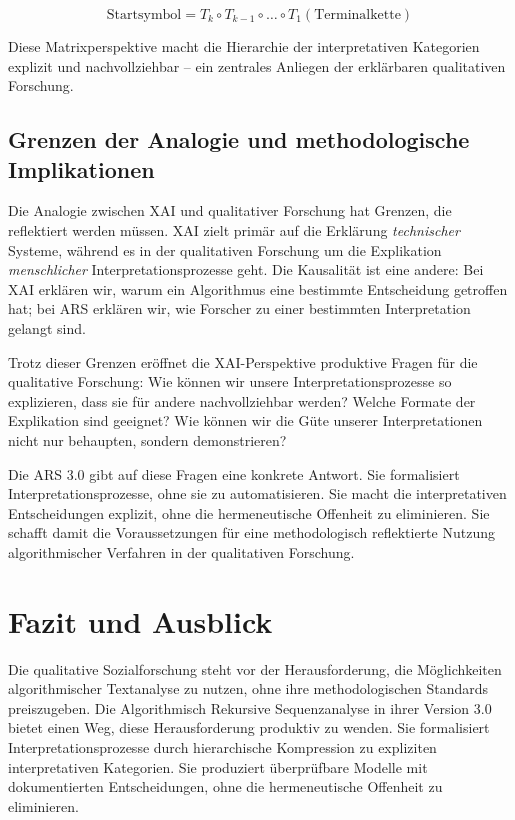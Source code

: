\documentclass[
  12pt,
  a4paper,
  oneside,
  titlepage
]{article}
\begin{document}
\[
\text{Startsymbol} = T_k \circ T_{k-1} \circ \ldots \circ T_1(\text{Terminalkette})
\]

Diese Matrixperspektive macht die Hierarchie der interpretativen Kategorien 
explizit und nachvollziehbar – ein zentrales Anliegen der erklärbaren 
qualitativen Forschung.

\subsection{Grenzen der Analogie und methodologische Implikationen}

Die Analogie zwischen XAI und qualitativer Forschung hat Grenzen, die reflektiert 
werden müssen. XAI zielt primär auf die Erklärung \textit{technischer} Systeme, 
während es in der qualitativen Forschung um die Explikation \textit{menschlicher} 
Interpretationsprozesse geht. Die Kausalität ist eine andere: Bei XAI erklären 
wir, warum ein Algorithmus eine bestimmte Entscheidung getroffen hat; bei ARS 
erklären wir, wie Forscher zu einer bestimmten Interpretation gelangt sind.

Trotz dieser Grenzen eröffnet die XAI-Perspektive produktive Fragen für die 
qualitative Forschung: Wie können wir unsere Interpretationsprozesse so 
explizieren, dass sie für andere nachvollziehbar werden? Welche Formate der 
Explikation sind geeignet? Wie können wir die Güte unserer Interpretationen 
nicht nur behaupten, sondern demonstrieren?

Die ARS 3.0 gibt auf diese Fragen eine konkrete Antwort. Sie formalisiert 
Interpretationsprozesse, ohne sie zu automatisieren. Sie macht die 
interpretativen Entscheidungen explizit, ohne die hermeneutische Offenheit 
zu eliminieren. Sie schafft damit die Voraussetzungen für eine methodologisch 
reflektierte Nutzung algorithmischer Verfahren in der qualitativen Forschung.

\section{Fazit und Ausblick}

Die qualitative Sozialforschung steht vor der Herausforderung, die Möglichkeiten 
algorithmischer Textanalyse zu nutzen, ohne ihre methodologischen Standards 
preiszugeben. Die Algorithmisch Rekursive Sequenzanalyse in ihrer Version 3.0 
bietet einen Weg, diese Herausforderung produktiv zu wenden. Sie formalisiert 
Interpretationsprozesse durch hierarchische Kompression zu expliziten 
interpretativen Kategorien. Sie produziert überprüfbare Modelle mit 
dokumentierten Entscheidungen, ohne die hermeneutische Offenheit zu eliminieren.
\end{document}
